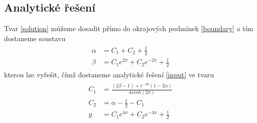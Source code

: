 \documentclass[a4paper]{article}
\begin{document}
\subsection*{Analytické řešení}
Tvar \eqref{solution} můžeme dosadit přímo do okrajových podmínek \eqref{boundary} a tím dostaneme soustavu
\begin{align}
	\begin{split}
		\alpha &= C_1 + C_2 + \frac{1}{2} \\
		\beta &= C_1 e^{ 2 \pi } + C_2 e^{ -2 \pi } + \frac{1}{2}
	\end{split}
\end{align}
kterou lze vyřešit, čímž dostaneme analytické řešení \eqref{input} ve tvaru
\begin{align}
	\begin{split}
		C_1 &= \frac{\left( 2 \beta - 1 \right) + e^{ -2 \pi } \left( 1 - 2 \alpha \right)}{4 sinh \left( 2 \pi \right)} \\
		C_2 &= \alpha - \frac{1}{2} - C_1 \\
		y &= C_1 e^{ 4x } + C_2 e^{ -4x } + \frac{1}{2}
	\end{split}
\end{align}
\end{document}
